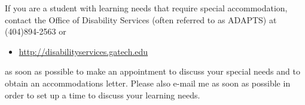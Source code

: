         If you are a student with learning needs that require special accommodation, contact the Office of Disability Services (often referred to as ADAPTS) at (404)894-2563 or 
        \begin{itemize}
            \item \url{http://disabilityservices.gatech.edu}
        \end{itemize} 
        as soon as possible to make an appointment to discuss your special needs and to obtain an accommodations letter. Please also e-mail me as soon as possible in order to set up a time to discuss your learning needs.
